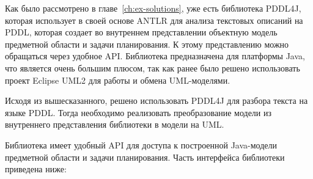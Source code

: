 Как было рассмотрено в главе~\ref{ch:ex-solutions}, уже есть библиотека PDDL4J, которая использует в своей основе ANTLR для анализа текстовых описаний на PDDL, которая создает во внутреннем представлении объектную модель предметной области и задачи планирования. К этому представлению можно обращаться  через удобное API. Библиотека предназначена для платформы Java, что является очень большим плюсом, так как ранее было решено использовать проект Eclipse UML2 для работы и обмена UML-моделями. 

Исходя из вышесказанного, решено использовать PDDL4J для разбора текста на языке PDDL. Тогда необходимо реализовать преобразование модели из внутреннего представления библиотеки в модели на UML.

Библиотека имеет удобный API для доступа к построенной Java-модели предметной области и задачи планирования. Часть интерфейса библиотеки приведена ниже:
\\

